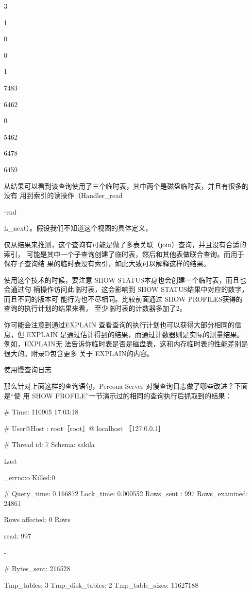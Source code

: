 {3

1

0

0

1

7483

6462

0

5462

6478

6459

从结果可以看到该查询使用了三个临时表，其中两个是磁盘临时表，并且有很多的没有
用到索引的读操作（Handler\_read

-rnd

L\_next）。假设我们不知道这个视图的具体定义，

仅从结果来推测，这个查询有可能是做了多表关联（join）查询，并且没有合适的索引，
可能是其中一个子查询创建了临时表，然后和其他表做联合查询。而用于保存子查询结
果的临时表没有索引，如此大致可以解释这样的结果。

使用这个技术的时候，要注意 SHOW STATUS本身也会创建一个临时表，而且也会通过句
柄操作访问此临时表，这会影响到 SHOW STATUS结果中对应的数字，而且不同的版本可
能行为也不尽相同。比较前面通过 SHOW PROFILES获得的查询的执行计划的结果来看，
至少临时表的计数器多加了2。

你可能会注意到通过EXPLAIN 查看查询的执行计划也可以获得大部分相同的信息，但
EXPLAIN 是通过估计得到的结果，而通过计数器则是实际的测量结果。例如，EXPLAIN无
法告诉你临时表是否是磁盘表，这和内存临时表的性能差别是很大的。附录D包含更多
关于 EXPLAIN的内容。

使用慢查询日志

那么针对上面这样的查询语句，Percona Server 对慢查询日志做了哪些改进？下面是“使
用 SHOW PROFILE”一节演示过的相同的查询执行后抓取到的结果：

# Time: 110905 17:03:18

# User@Host : root［root］@ localhost ［127.0.0.1］

# Thread id: 7 Schema: sakila

Last

\_errno:o Killed:0

# Query\_time: 0.166872 Lock\_time: 0.000552 Rows\_sent : 997 Rows\_examined: 24861

Rows affected: 0 Rows

read: 997

-

# Bytes\_sent: 216528

Tmp\_tables: 3 Tmp\_disk\_tables: 2 Tmp\_table\_sizes: 11627188

}
